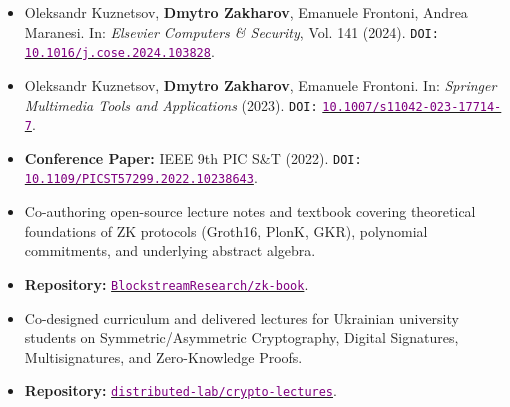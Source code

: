 \documentclass[10pt,a4paper,ragged2e]{maltacv}
\begin{document}
\begin{itemize}
  \item Oleksandr Kuznetsov, \textbf{Dmytro Zakharov}, Emanuele Frontoni, Andrea Maranesi. In: \textit{Elsevier Computers \& Security}, Vol. 141 (2024). \texttt{DOI:} \href{https://doi.org/10.1016/j.cose.2024.103828}{\textcolor{purple}{\texttt{10.1016/j.cose.2024.103828}}}.
\end{itemize}

\begin{itemize}
  \item Oleksandr Kuznetsov, \textbf{Dmytro Zakharov}, Emanuele Frontoni. In: \textit{Springer Multimedia Tools and Applications} (2023). \texttt{DOI:} \href{https://doi.org/10.1007/s11042-023-17714-7}{\textcolor{purple}{\texttt{10.1007/s11042-023-17714-7}}}.
  \item \textbf{Conference Paper:} IEEE 9th PIC S\&T (2022). \texttt{DOI:} \href{https://doi.org/10.1109/PICST57299.2022.10238643}{\textcolor{purple}{\texttt{10.1109/PICST57299.2022.10238643}}}.
\end{itemize}

\medskip
{}

\begin{itemize}
  \item Co-authoring open-source lecture notes and textbook covering theoretical foundations of ZK protocols (Groth16, PlonK, GKR), polynomial commitments, and underlying abstract algebra.
  \item \textbf{Repository:} \href{https://github.com/BlockstreamResearch/zk-book/releases/tag/latest}{\textcolor{purple}{\texttt{BlockstreamResearch/zk-book}}}.
\end{itemize}

\divider

\begin{itemize}
  \item Co-designed curriculum and delivered lectures for Ukrainian university students on Symmetric/Asymmetric Cryptography, Digital Signatures, Multisignatures, and Zero-Knowledge Proofs.
  \item \textbf{Repository:} \href{https://github.com/distributed-lab/crypto-lectures}{\textcolor{purple}{\texttt{distributed-lab/crypto-lectures}}}.
\end{itemize}
\end{document}
